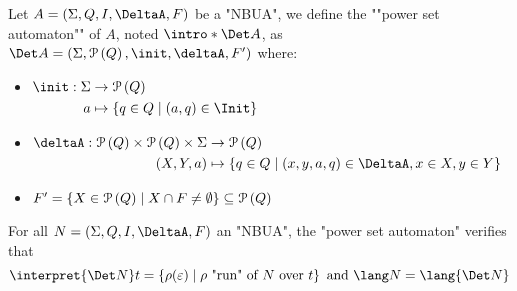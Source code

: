 \documentclass[a4paper,UKenglish,cleveref, autoref, thm-restate]{lipics-v2021}
\begin{document}
\begin{definition}
	\AP Let $A = \NBUA$ be a "NBUA", we define the ""power set automaton"" of $A$, noted $\intro* \Det A$, as
	$\Det A = (\Sigma, \parts Q, \init, \deltaA, F')$ where:

	\begin{itemize}
		\item $\begin{aligned}[t]
				      \init      : \Sigma & \to \parts Q                              \\
				      a                   & \mapsto \setdef{q \in Q}{(a,q) \in \Init}
			      \end{aligned} $

		\item $\begin{aligned}[t]
				      \deltaA               : \parts Q \times \parts Q \times \Sigma & \to \parts Q                                                      \\
				      (X, Y, a)                                                      & \mapsto \setdef{q \in Q}{(x,y,a,q) \in \DeltaA, x \in X, y \in Y}
			      \end{aligned}$

		\item $F' = \left\{X \in \mathcal{P}\left(Q\right) \mid X \cap F \neq \emptyset\right\} \subseteq \mathcal{P}\left(Q\right)$
	\end{itemize}
\end{definition}

\begin{theorem}
	For all $N = \NBUA$ an "NBUA", the "power set automaton" verifies that
	\[
		\interpret {\Det N} t = \setdef {\rho(\varepsilon)}{\text{$\rho$ "run" of~$N$ over~$t$}} \text{ and } \lang N = \lang {\Det N}
	\]
\end{theorem}
\end{document}
